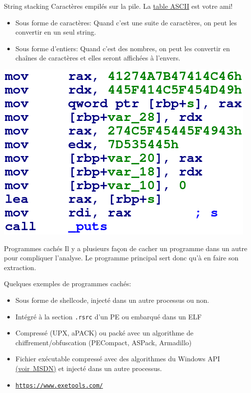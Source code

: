 \documentclass[10pt,xcolor={table,dvipsnames},t]{beamer}
\begin{document}
\begin{frame}{String stacking}
    Caractères empilés sur la pile. La \href{http://www.asciitable.com/}{table ASCII} est votre ami!
    \begin{itemize}
        \item Sous forme de caractères: Quand c'est une suite de caractères, on peut les convertir en un seul string. 
        \item Sous forme d'entiers: Quand c'est des nombres, on peut les convertir en chaînes de caractères et elles seront affichées à l'envers.
    \end{itemize}

    \begin{center}
        \includegraphics[width=.40\textwidth,height=.40\textheight]{stringstack}
    \end{center}

\end{frame}

\begin{frame}{Programmes cachés}
    Il y a plusieurs façon de cacher un programme dans un autre pour compliquer l'analyse. Le programme principal sert donc qu'à en faire son extraction.
    
    Quelques exemples de programmes cachés:
    \begin{itemize}
        \item Sous forme de shellcode, injecté dans un autre processus ou non.
        \item Intégré à la section \texttt{.rsrc} d'un PE ou embarqué dans un ELF
        \item Compressé (UPX, aPACK) ou packé avec un algorithme de chiffrement/obfuscation (PECompact, ASPack, Armadillo)
        \item Fichier exécutable compressé avec des algorithmes du Windows API \href{https://docs.microsoft.com/en-us/windows/win32/cmpapi/-compression-portal}{(voir MSDN)} et injecté dans un autre processus.
        \item \href{https://www.exetools.com/}{\texttt{https://www.exetools.com/}}
    \end{itemize}
\end{frame}
\end{document}
